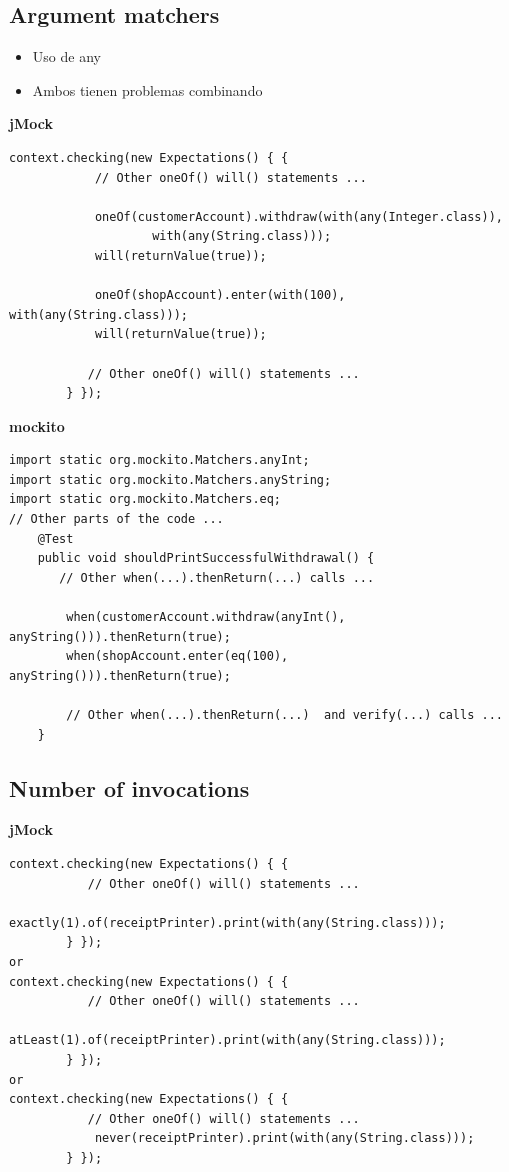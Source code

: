 \documentclass[]{beamer}
\begin{document}
\subsection{Argument matchers}
\begin{frame}
  \begin{itemize}
    \item Uso de any
    \item Ambos tienen problemas combinando
  \end{itemize}
\end{frame}

\begin{frame}[fragile]
\textbf{jMock}
\begin{verbatim}
context.checking(new Expectations() { {
            // Other oneOf() will() statements ...

            oneOf(customerAccount).withdraw(with(any(Integer.class)),
                    with(any(String.class)));
            will(returnValue(true));

            oneOf(shopAccount).enter(with(100), with(any(String.class)));
            will(returnValue(true));

           // Other oneOf() will() statements ...
        } });
\end{verbatim}
\textbf{mockito}
\begin{verbatim}
import static org.mockito.Matchers.anyInt;
import static org.mockito.Matchers.anyString;
import static org.mockito.Matchers.eq;
// Other parts of the code ...
    @Test
    public void shouldPrintSuccessfulWithdrawal() {
       // Other when(...).thenReturn(...) calls ...

        when(customerAccount.withdraw(anyInt(), anyString())).thenReturn(true);
        when(shopAccount.enter(eq(100), anyString())).thenReturn(true);

        // Other when(...).thenReturn(...)  and verify(...) calls ...
    }
\end{verbatim}  
\end{frame}

\subsection{Number of invocations}
\begin{frame}[fragile]
\textbf{jMock}
\begin{verbatim}
context.checking(new Expectations() { {
           // Other oneOf() will() statements ...
            exactly(1).of(receiptPrinter).print(with(any(String.class)));
        } });
or
context.checking(new Expectations() { {
           // Other oneOf() will() statements ...
            atLeast(1).of(receiptPrinter).print(with(any(String.class)));
        } });
or
context.checking(new Expectations() { {
           // Other oneOf() will() statements ...
            never(receiptPrinter).print(with(any(String.class)));
        } });
\end{verbatim}
\end{frame}
\end{document}
